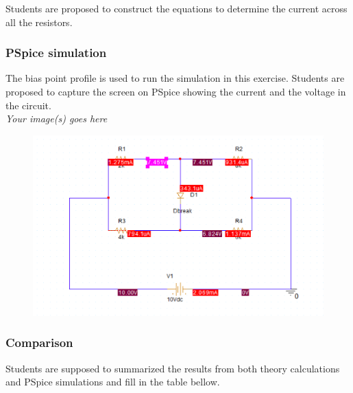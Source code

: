Students are proposed to construct the equations to determine the current across all the resistors.

\dotfill\bigskip\par\mbox{}\dotfill
\dotfill\bigskip\par\mbox{}\dotfill
\dotfill\bigskip\par\mbox{}\dotfill
\dotfill\bigskip\par\mbox{}\dotfill
\subsubsection{PSpice simulation}
The bias point profile is used to run the simulation in this exercise. Students are proposed to capture the screen on PSpice showing the current and the voltage in the circuit.\\

\textit{Your image(s) goes here}\\
\begin{figure}[!htp]
    \centering
    \includegraphics[width = 500px]{source/picture/bai_2/sim_ex3.png}
\end{figure}
\newpage
\subsubsection{Comparison}
Students are supposed to summarized the results from both theory calculations and PSpice simulations and fill in the table bellow.\\

